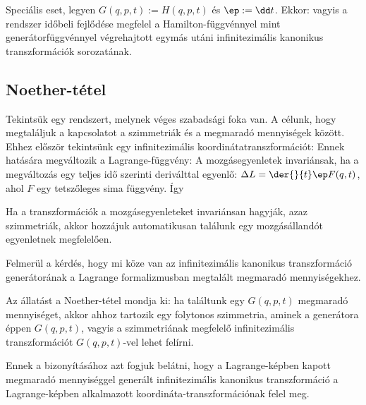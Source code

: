    Speciális eset, legyen $G(q,p,t):=H(q,p,t)$ és $\ep:=\dd t$.
   Ekkor:
   vagyis a rendszer időbeli fejlődése megfelel a Hamilton-függvénnyel mint generátorfüggvénnyel végrehajtott egymás utáni infinitezimális kanonikus transzformációk sorozatának. 
   
  \subsection{Noether-tétel}

   Tekintsük egy rendszert, melynek véges szabadsági foka van.
   A célunk, hogy megtaláljuk a kapcsolatot a szimmetriák és a megmaradó mennyiségek között.
   Ehhez először tekintsünk egy infinitezimális koordinátatranszformációt: 
   Ennek hatására megváltozik a Lagrange-függvény:
   A mozgásegyenletek invariánsak, ha a megváltozás egy teljes idő szerinti deriválttal egyenlő:
   $\Delta L=\der{}{t}\ep F(q,t)$, ahol $F$ egy tetszőleges sima függvény. Így
   
   Ha a transzformációk a mozgásegyenleteket invariánsan hagyják, azaz szimmetriák, akkor hozzájuk automatikusan találunk egy mozgásállandót  egyenletnek megfelelően.
  
   Felmerül a kérdés, hogy mi köze van az infinitezimális kanonikus transzformáció generátorának a Lagrange formalizmusban megtalált megmaradó mennyiségekhez.
   
   Az állatást a Noether-tétel mondja ki: ha találtunk egy $G(q,p,t)$ megmaradó mennyiséget, akkor ahhoz tartozik egy folytonos szimmetria, aminek a generátora éppen $G(q,p,t)$, vagyis a szimmetriának megfelelő infinitezimális transzformációt $G(q,p,t)$-vel lehet felírni.
   
   Ennek a bizonyításához azt fogjuk belátni, hogy a Lagrange-képben kapott megmaradó mennyiséggel generált infinitezimális kanonikus transzformáció a Lagrange-képben alkalmazott koordináta-transzformációnak felel meg. 
   
